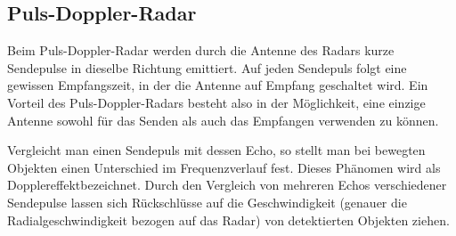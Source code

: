 
\subsection{Puls-Doppler-Radar}

Beim Puls-Doppler-Radar werden durch die Antenne des Radars kurze Sendepulse in dieselbe Richtung emittiert. Auf jeden Sendepuls folgt eine gewissen Empfangszeit, in der die Antenne auf Empfang geschaltet wird. Ein Vorteil des Puls-Doppler-Radars besteht also in der Möglichkeit, eine einzige Antenne sowohl für das Senden als auch das Empfangen verwenden zu können. 

Vergleicht man einen Sendepuls mit dessen Echo, so stellt man bei bewegten Objekten einen Unterschied im Frequenzverlauf fest. Dieses Phänomen wird als \glqq Dopplereffekt\grqq bezeichnet. Durch den Vergleich von mehreren Echos verschiedener Sendepulse lassen sich Rückschlüsse auf die Geschwindigkeit (genauer die Radialgeschwindigkeit bezogen auf das Radar) von detektierten Objekten ziehen. 